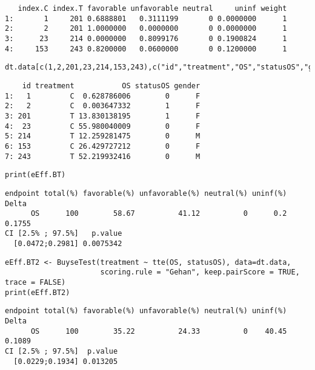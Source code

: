 \documentclass[12pt]{article}
\begin{document}
\begin{verbatim}
   index.C index.T favorable unfavorable neutral     uninf weight
1:       1     201 0.6888801   0.3111199       0 0.0000000      1
2:       2     201 1.0000000   0.0000000       0 0.0000000      1
3:      23     214 0.0000000   0.8099176       0 0.1900824      1
4:     153     243 0.8200000   0.0600000       0 0.1200000      1
\end{verbatim}


\lstset{language=r,label= ,caption= ,captionpos=b,numbers=none}
\begin{lstlisting}
dt.data[c(1,2,201,23,214,153,243),c("id","treatment","OS","statusOS","gender")]
\end{lstlisting}

\begin{verbatim}
    id treatment           OS statusOS gender
1:   1         C  0.628786006        0      F
2:   2         C  0.003647332        1      F
3: 201         T 13.830138195        1      F
4:  23         C 55.980040009        0      F
5: 214         T 12.259281475        0      M
6: 153         C 26.429727212        0      F
7: 243         T 52.219932416        0      M
\end{verbatim}


\lstset{language=r,label= ,caption= ,captionpos=b,numbers=none}
\begin{lstlisting}
print(eEff.BT)
\end{lstlisting}

\begin{verbatim}
endpoint total(%) favorable(%) unfavorable(%) neutral(%) uninf(%)  Delta
      OS      100        58.67          41.12          0      0.2 0.1755
CI [2.5% ; 97.5%]   p.value
  [0.0472;0.2981] 0.0075342
\end{verbatim}


\lstset{language=r,label= ,caption= ,captionpos=b,numbers=none}
\begin{lstlisting}
eEff.BT2 <- BuyseTest(treatment ~ tte(OS, statusOS), data=dt.data,
                      scoring.rule = "Gehan", keep.pairScore = TRUE, trace = FALSE)
print(eEff.BT2)
\end{lstlisting}

\begin{verbatim}
endpoint total(%) favorable(%) unfavorable(%) neutral(%) uninf(%)  Delta
      OS      100        35.22          24.33          0    40.45 0.1089
CI [2.5% ; 97.5%]  p.value
  [0.0229;0.1934] 0.013205
\end{verbatim}
\end{document}
